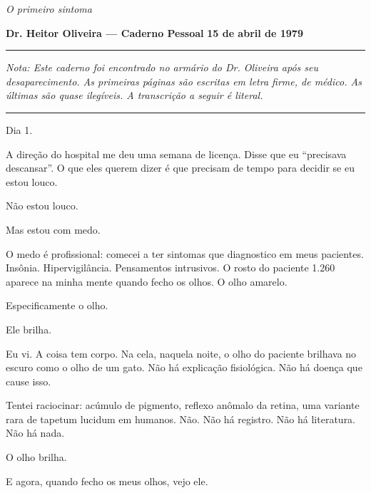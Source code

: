 
\noindent \textit{O primeiro sintoma}

\noindent \textbf{Dr. Heitor Oliveira --- Caderno Pessoal}
\textbf{15 de abril de 1979}

\vspace{0.5em}\noindent\rule{\textwidth}{0.5pt}\vspace{0.5em}

\noindent \textit{Nota: Este caderno foi encontrado no armário do Dr. Oliveira após seu desaparecimento. As primeiras páginas são escritas em letra firme, de médico. As últimas são quase ilegíveis. A transcrição a seguir é literal.}

\vspace{0.5em}\noindent\rule{\textwidth}{0.5pt}\vspace{0.5em}

\noindent Dia 1.

\noindent A direção do hospital me deu uma semana de licença. Disse que eu \textquotedblleft{}precisava descansar\textquotedblright{}. O que eles querem dizer é que precisam de tempo para decidir se eu estou louco.

\noindent Não estou louco.

\noindent Mas estou com medo.

\noindent O medo é profissional: comecei a ter sintomas que diagnostico em meus pacientes. Insônia. Hipervigilância. Pensamentos intrusivos. O rosto do paciente 1.260 aparece na minha mente quando fecho os olhos. O olho amarelo.

\noindent Especificamente o olho.

\noindent Ele brilha.

\noindent Eu vi. A coisa tem corpo. Na cela, naquela noite, o olho do paciente brilhava no escuro como o olho de um gato. Não há explicação fisiológica. Não há doença que cause isso.

\noindent Tentei raciocinar: acúmulo de pigmento, reflexo anômalo da retina, uma variante rara de tapetum lucidum em humanos. Não. Não há registro. Não há literatura. Não há nada.

\noindent O olho brilha.

\noindent E agora, quando fecho os meus olhos, vejo ele.

